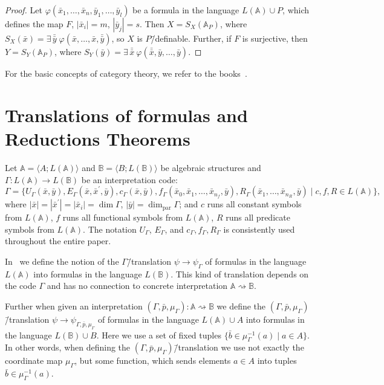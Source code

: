 \documentclass[12pt]{article}
\theoremstyle{definition}
\def\MA{{\mathbb{A}}}
\def\MB{{\mathbb{B}}}
\def\param{{\mathrm{par}}}
\begin{document}
\begin{proof}
Let $\varphi(\bar x_1,\ldots,\bar x_n,\bar y_1,\ldots,\bar y_l)$ be a formula in the language $L(\MA)\cup P$, which defines the map $F$, $|\bar x_i|=m$,  $|\bar y_j|=s$. Then  $X=S_X(\MA_P)$, where $S_X(\bar x)=\exists \, \bar {\bar y}\; \varphi(\bar x,\ldots,\bar x,\bar {\bar y})$, so $X$ is $P$\=/definable.  Further, if $F$ is surjective, then $Y=S_Y(\MA_P)$, where $S_Y(\bar y)=\exists\,\bar {\bar x}\:\varphi(\bar {\bar x}, \bar y,\ldots,\bar y)$.  
\end{proof}

For the basic concepts of category theory, we refer to the books~\cite{BarrWells, MacLane}. 

\section{Translations of formulas and Reductions Theorems}\label{sec:RT}

Let $\MA=\langle A; L(\MA)\rangle$ and $\MB=\langle B; L(\MB)\rangle$ be algebraic structures and  $\Gamma\colon L(\MA)\to L(\MB)$ be an interpretation code:
\begin{equation*} 
\Gamma =  \{U_\Gamma(\bar x,\bar y), E_\Gamma(\bar x, \bar x^\prime,\bar y), c_\Gamma(\bar x, \bar y), f_\Gamma(\bar x_0, \bar x_1, \ldots,\bar x_{n_f},\bar y), R_\Gamma(\bar x_1,\ldots,\bar x_{n_R},\bar y) \mid c,f,R \in L(\MA)\},
\end{equation*}
where $|\bar x|=|\bar x^\prime|=|\bar x_i|=\dim\Gamma$, $|\bar y|=\dim_\param\Gamma$; and $c$ runs all constant symbols from $L(\MA)$, $f$ runs all functional symbols from $L(\MA)$, $R$ runs all predicate symbols from $L(\MA)$. The notation $U_\Gamma$, $E_\Gamma$, and $c_\Gamma,f_\Gamma, R_\Gamma$ is consistently used throughout the entire paper. 

In~\cite[Subsection~2.7]{Th_int1} we define the notion of the $\Gamma$\=/translation $\psi\to\psi_{\Gamma}$ of formulas in the language $L(\MA)$ into formulas in the language $L(\MB)$. This kind of translation depends on the code $\Gamma$ and has no connection to concrete interpretation $\MA\rightsquigarrow\MB$. 

Further when given an interpretation $(\Gamma,\bar p, \mu_\Gamma)\colon \MA\rightsquigarrow\MB$ we define the $(\Gamma,\bar p, \mu_\Gamma)$\=/translation $\psi\to\psi_{\Gamma,\bar p,\mu_\Gamma}$ of formulas in the language $L(\MA)\cup A$ into formulas in the language $L(\MB)\cup B$. Here we use a set of fixed tuples $\{\bar b\in \mu_\Gamma^{-1}(a)\mid a\in A\}$. In other words, when defining the $(\Gamma,\bar p, \mu_\Gamma)$\=/translation we use not exactly the coordinate map $\mu_\Gamma$, but some function, which sends elements $a\in A$ into tuples $\bar b\in \mu_\Gamma^{-1}(a)$. 
\end{document}
